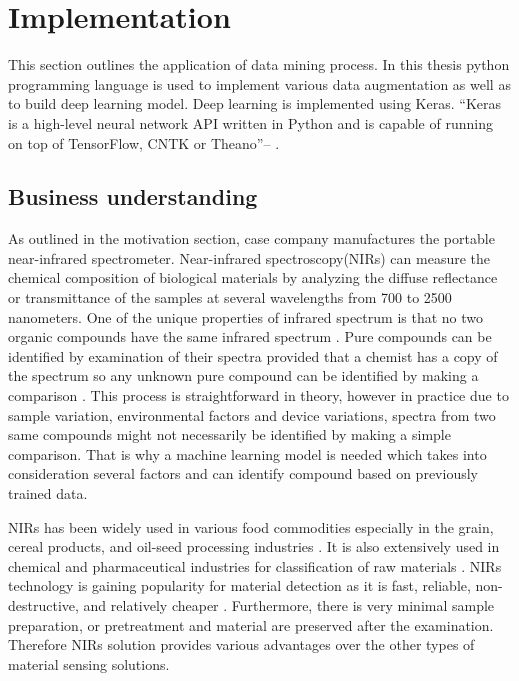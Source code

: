\chapter{Implementation}
\label{chapter:implementation}

This section outlines the application of data mining process. In this thesis python programming language is used to implement various data augmentation as well as to build deep learning model. Deep learning is implemented using Keras. ``Keras is a high-level neural network API written in Python and is capable of running on top of TensorFlow, CNTK or Theano''-- \citep{chollet2015keras}.  

\section{Business understanding}
As outlined in the motivation section, case company manufactures the portable near-infrared spectrometer. Near-infrared spectroscopy(NIRs) can measure the chemical composition of biological materials by analyzing the diffuse reflectance or transmittance of the samples at several wavelengths from 700 to 2500 nanometers. One of the unique properties of infrared spectrum is that no two organic compounds have the same infrared spectrum \citep{rsc}. Pure compounds can be identified by examination of their spectra provided that a chemist has a copy of the spectrum so any unknown pure compound can be identified by making a comparison \citep{rsc}. This process is straightforward in theory, however in practice due to sample variation, environmental factors and device variations, spectra from two same compounds might not necessarily be identified by making a simple comparison. That is why a machine learning model is needed which takes into consideration several factors and can identify compound based on previously trained data.

NIRs has been widely used in various food commodities especially in the grain, cereal products, and oil-seed processing industries \citep{elmessery2014manufacture}. It is also extensively used in chemical and pharmaceutical industries for classification of raw materials \citep{elmessery2014manufacture}. NIRs technology is gaining popularity for material detection as it is fast, reliable, non-destructive, and relatively cheaper \citep{evans1999near}. Furthermore, there is very minimal sample preparation, or pretreatment and material are preserved after the examination. Therefore NIRs solution provides various advantages over the other types of material sensing solutions.

